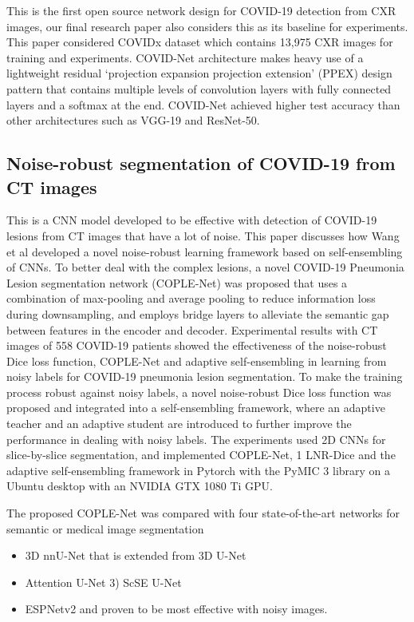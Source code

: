 \documentclass{sigkddExp}
\begin{document}
This is the first open source network design for COVID-19 detection from CXR images,
our final research paper also considers this as its baseline for experiments.
This paper considered COVIDx dataset which contains 13,975 CXR images for training and
experiments. COVID-Net architecture makes heavy use of a lightweight residual
‘projection expansion projection extension’ (PPEX) design pattern that contains multiple
levels of convolution layers with fully connected layers and a softmax at the end.
COVID-Net achieved higher test accuracy than other architectures such as VGG-19 and ResNet-50.

\subsection{Noise-robust segmentation of COVID-19 from CT images}

This is a CNN model developed to be effective with detection of COVID-19 lesions from 
CT images that have a lot of noise. This paper discusses how Wang et al developed a
novel noise-robust learning framework based on self-ensembling of CNNs.  To better
deal with the complex lesions, a novel COVID-19 Pneumonia Lesion segmentation network
(COPLE-Net) was proposed that uses a combination of max-pooling and average pooling to
reduce information loss during downsampling, and employs bridge layers to alleviate the
semantic gap between features in the encoder and decoder. Experimental results with CT
images of 558 COVID-19 patients showed the effectiveness of the noise-robust Dice loss
function, COPLE-Net and adaptive self-ensembling in learning from noisy labels for COVID-19
pneumonia lesion segmentation. To make the training process robust against noisy labels,
a novel noise-robust Dice loss function was proposed and integrated into a self-ensembling
framework, where an adaptive teacher and an adaptive student are introduced to further improve
the performance in dealing with noisy labels. The experiments used 2D CNNs for slice-by-slice
segmentation, and implemented COPLE-Net, 1 LNR-Dice and the adaptive self-ensembling framework
in Pytorch with the PyMIC 3 library on a Ubuntu desktop with an NVIDIA GTX 1080 Ti GPU. 

The proposed COPLE-Net was compared with four state-of-the-art networks for semantic or medical
image segmentation

\begin{itemize}
       \item 3D nnU-Net that is extended from 3D U-Net
       \item Attention U-Net 3) ScSE U-Net
       \item ESPNetv2 and proven to be most effective with noisy images.
\end{itemize}
\end{document}
